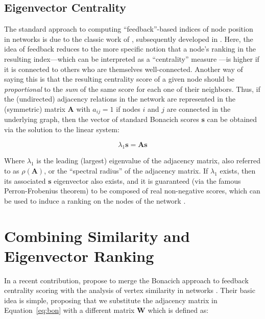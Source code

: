 \documentclass[12pt]{article}
\begin{document}
\subsection*{Eigenvector Centrality}

The standard approach to computing ``feedback''-based indices of node position in networks is due to the classic work of \citet{bonacich1972factoring-03e}, subsequently developed in \citet{bonacich1987power-41a}. Here, the idea of feedback reduces to the more specific notion that a node's ranking in the resulting index---which can be interpreted as a ``centrality'' measure \citep{borgatti2006graph-theoretic-1a0}---is higher if it is connected to others who are themselves well-connected. Another way of saying this is that the resulting centrality score of a given node should be \textit{proportional} to the \textit{sum} of the same score for each one of their neighbors. Thus, if the (undirected) adjacency relations in the network are represented in the (symmetric) matrix $\mathbf{A}$ with $a_{ij} = 1$ if nodes $i$ and $j$ are connected in the underlying graph, then the vector of standard Bonacich scores $\mathbf{s}$ can be obtained via the solution to the linear system:

\begin{equation}
    \lambda_{1}\mathbf{s} = \mathbf{A}\mathbf{s}
    \label{eq:bon}
\end{equation}

Where $\lambda_{1}$ is the leading (largest) eigenvalue of the adjacency matrix, also referred to as $\rho(\mathbf{A})$, or the ``spectral radius'' of the adjacency matrix. If $\lambda_{1}$ exists, then its associated $\mathbf{s}$ eigenvector also exists, and it is guaranteed (via the famous Perron-Frobenius theorem) to be composed of real non-negative scores, which can be used to induce a ranking on the nodes of the network \citep{vigna2016spectral-19a}.

\section*{Combining Similarity and Eigenvector Ranking}

In a recent contribution, \citet{alvarez-socorro2015eigencentrality-66c} propose to merge the Bonacich approach to feedback centrality scoring with the analysis of vertex similarity in networks \citep{leicht2006vertex-6f1}. Their basic idea is simple, proposing that we substitute the adjacency matrix in Equation~\ref{eq:bon} with a different matrix $\mathbf{W}$ which is defined as:
\end{document}
